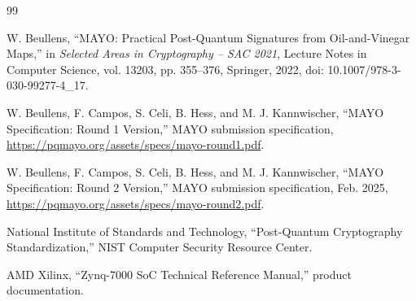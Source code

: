 \documentclass[conference]{IEEEtran}
\begin{document}
\begin{thebibliography}{99}

W. Beullens, ``MAYO: Practical Post-Quantum Signatures from Oil-and-Vinegar Maps,'' in \emph{Selected Areas in Cryptography -- SAC 2021}, Lecture Notes in Computer Science, vol. 13203, pp. 355--376, Springer, 2022, doi: 10.1007/978-3-030-99277-4\_17.

W. Beullens, F. Campos, S. Celi, B. Hess, and M. J. Kannwischer, ``MAYO Specification: Round 1 Version,'' MAYO submission specification, \url{https://pqmayo.org/assets/specs/mayo-round1.pdf}.

W. Beullens, F. Campos, S. Celi, B. Hess, and M. J. Kannwischer, ``MAYO Specification: Round 2 Version,'' MAYO submission specification, Feb. 2025, \url{https://pqmayo.org/assets/specs/mayo-round2.pdf}.

National Institute of Standards and Technology, ``Post-Quantum Cryptography Standardization,'' NIST Computer Security Resource Center.

AMD Xilinx, ``Zynq-7000 SoC Technical Reference Manual,'' product documentation.

\end{thebibliography}
\end{document}
